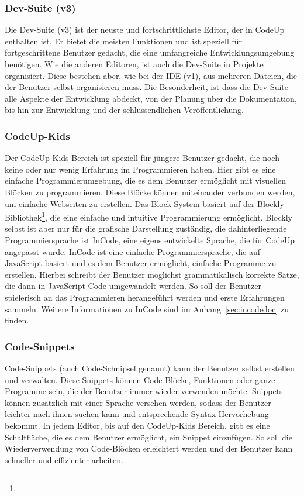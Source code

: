 \documentclass[main.tex]{subfiles}
\begin{document}
    \subsubsection{Dev-Suite (v3)}
    Die Dev-Suite (v3) ist der neuste und fortschrittlichste Editor, der in CodeUp enthalten ist.
    Er bietet die meisten Funktionen und ist speziell für fortgeschrittene Benutzer gedacht, die eine umfangreiche Entwicklungsumgebung benötigen.
    Wie die anderen Editoren, ist auch die Dev-Suite in Projekte organisiert.
    Diese bestehen aber, wie bei der IDE (v1), aus mehreren Dateien, die der Benutzer selbst organisieren muss.
    Die Besonderheit, ist dass die Dev-Suite alle Aspekte der Entwicklung abdeckt, von der Planung über die Dokumentation, bis hin zur Entwicklung und der schlussendlichen Veröffentlichung.

    \subsubsection{CodeUp-Kids}
    Der CodeUp-Kids-Bereich ist speziell für jüngere Benutzer gedacht, die noch keine oder nur wenig Erfahrung im Programmieren haben.
    Hier gibt es eine einfache Programmierumgebung, die es dem Benutzer ermöglicht mit visuellen Blöcken zu programmieren.
    Diese Blöcke können miteinander verbunden werden, um einfache Webseiten zu erstellen.
    Das Block-System basiert auf der Blockly-Bibliothek\footnote{}, die eine einfache und intuitive Programmierung ermöglicht.
    Blockly selbst ist aber nur für die grafische Darstellung zuständig, die dahinterliegende Programmiersprache ist InCode, eine eigens entwickelte Sprache, die für CodeUp angepasst wurde.
    InCode ist eine einfache Programmiersprache, die auf JavaScript basiert und es dem Benutzer ermöglicht, einfache Programme zu erstellen.
    Hierbei schreibt der Benutzer möglichst grammatikalisch korrekte Sätze, die dann in JavaScript-Code umgewandelt werden.
    So soll der Benutzer spielerisch an das Programmieren herangeführt werden und erste Erfahrungen sammeln.
    Weitere Informationen zu InCode sind im Anhang~\ref{sec:incodedoc} zu finden.
    \subsubsection{Code-Snippets}
    Code-Snippets (auch Code-Schnipsel genannt) kann der Benutzer selbst erstellen und verwalten.
    Diese Snippets können Code-Blöcke, Funktionen oder ganze Programme sein, die der Benutzer immer wieder verwenden möchte.
    Snippets können zusätzlich mit einer Sprache versehen werden, sodass der Benutzer leichter nach ihnen suchen kann und entsprechende Syntax-Hervorhebung bekommt.
    In jedem Editor, bis auf den CodeUp-Kids Bereich, gitb es eine Schaltfläche, die es dem Benutzer ermöglicht, ein Snippet einzufügen.
    So soll die Wiederverwendung von Code-Blöcken erleichtert werden und der Benutzer kann schneller und effizienter arbeiten.
\end{document}
